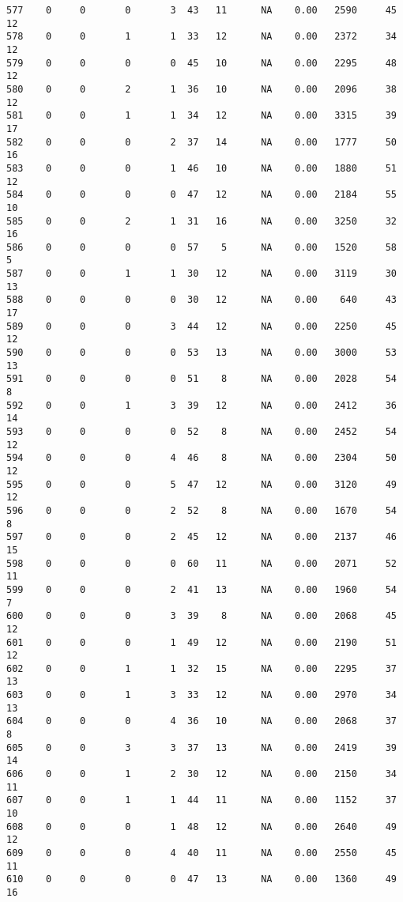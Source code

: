 \documentclass[
  letterpaper,
  DIV=11,
  numbers=noendperiod]{scrreprt}
\begin{document}
\begin{verbatim}
577    0     0       0       3  43   11      NA    0.00   2590     45      12
578    0     0       1       1  33   12      NA    0.00   2372     34      12
579    0     0       0       0  45   10      NA    0.00   2295     48      12
580    0     0       2       1  36   10      NA    0.00   2096     38      12
581    0     0       1       1  34   12      NA    0.00   3315     39      17
582    0     0       0       2  37   14      NA    0.00   1777     50      16
583    0     0       0       1  46   10      NA    0.00   1880     51      12
584    0     0       0       0  47   12      NA    0.00   2184     55      10
585    0     0       2       1  31   16      NA    0.00   3250     32      16
586    0     0       0       0  57    5      NA    0.00   1520     58       5
587    0     0       1       1  30   12      NA    0.00   3119     30      13
588    0     0       0       0  30   12      NA    0.00    640     43      17
589    0     0       0       3  44   12      NA    0.00   2250     45      12
590    0     0       0       0  53   13      NA    0.00   3000     53      13
591    0     0       0       0  51    8      NA    0.00   2028     54       8
592    0     0       1       3  39   12      NA    0.00   2412     36      14
593    0     0       0       0  52    8      NA    0.00   2452     54      12
594    0     0       0       4  46    8      NA    0.00   2304     50      12
595    0     0       0       5  47   12      NA    0.00   3120     49      12
596    0     0       0       2  52    8      NA    0.00   1670     54       8
597    0     0       0       2  45   12      NA    0.00   2137     46      15
598    0     0       0       0  60   11      NA    0.00   2071     52      11
599    0     0       0       2  41   13      NA    0.00   1960     54       7
600    0     0       0       3  39    8      NA    0.00   2068     45      12
601    0     0       0       1  49   12      NA    0.00   2190     51      12
602    0     0       1       1  32   15      NA    0.00   2295     37      13
603    0     0       1       3  33   12      NA    0.00   2970     34      13
604    0     0       0       4  36   10      NA    0.00   2068     37       8
605    0     0       3       3  37   13      NA    0.00   2419     39      14
606    0     0       1       2  30   12      NA    0.00   2150     34      11
607    0     0       1       1  44   11      NA    0.00   1152     37      10
608    0     0       0       1  48   12      NA    0.00   2640     49      12
609    0     0       0       4  40   11      NA    0.00   2550     45      11
610    0     0       0       0  47   13      NA    0.00   1360     49      16

\end{verbatim}
\end{document}
